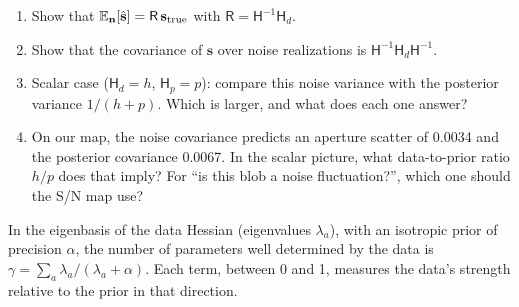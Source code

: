 \begin{enumerate}
  \item Show that $\mathbb{E}_{\mathbf n}[\hat{\mathbf s}] = \mathsf R\,\mathbf s_{\rm true}$ with $\mathsf R = \mathsf H^{-1}\mathsf H_d$.
  \item Show that the covariance of $\hat{\mathbf s}$ over noise realizations is $\mathsf H^{-1}\mathsf H_d\mathsf H^{-1}$.
  \item Scalar case ($\mathsf H_d = h$, $\mathsf H_p = p$): compare this noise variance with the posterior variance
    $1/(h+p)$. Which is larger, and what does each one answer?
  \item On our map, the noise covariance predicts an aperture scatter of 0.0034 and the posterior covariance 0.0067. In
    the scalar picture, what data-to-prior ratio $h/p$ does that imply? For ``is this blob a noise fluctuation?'',
    which one should the S/N map use?
\end{enumerate}



\begin{given}
In the eigenbasis of the data Hessian (eigenvalues $\lambda_a$), with an isotropic prior of precision $\alpha$, the number
of parameters well determined by the data is $\gamma = \sum_a \lambda_a/(\lambda_a + \alpha)$. Each term, between 0 and
1, measures the data's strength relative to the prior in that direction.
\end{given}


